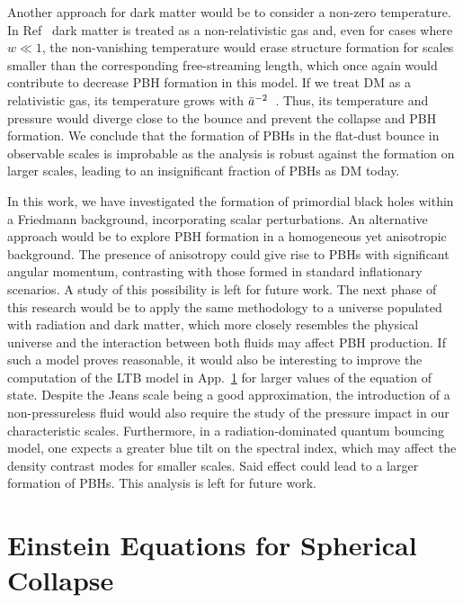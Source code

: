 \documentclass[a4paper,11pt]{article}
\begin{document}
Another approach for dark matter would be to consider a non-zero temperature. In Ref~\cite{Armendariz2014} dark matter is treated as a non-relativistic gas and, even for cases where $w\ll1$, the non-vanishing temperature would erase structure formation for scales smaller than the corresponding free-streaming length, which once again would contribute to decrease PBH formation in this model. If we treat DM as a relativistic gas, its temperature grows with $\Bar{a}^{-2}$~\cite{Mukhanov1992}. Thus, its temperature and pressure would diverge close to the bounce and prevent the collapse and PBH formation. We conclude that the formation of PBHs in the flat-dust bounce in observable scales is improbable as the analysis is robust against the formation on larger scales, leading to an insignificant fraction of PBHs as DM today.

In this work, we have investigated the formation of primordial black holes within a
Friedmann background, incorporating scalar perturbations. An alternative approach would
be to explore PBH formation in a homogeneous yet anisotropic background. The presence of
anisotropy could give rise to PBHs with significant angular momentum, contrasting with
those formed in standard inflationary scenarios. A study of this possibility is left for
future work. The next phase of this research would be to apply the same methodology to a
universe populated with radiation and dark matter, which more closely resembles the
physical universe and the interaction between both fluids may affect PBH production. If
such a model proves reasonable, it would also be interesting to improve the computation
of the LTB model in App.~\ref{appc} for larger values of the equation of state. Despite
the Jeans scale being a good approximation, the introduction of a non-pressureless fluid
would also require the study of the pressure impact in our characteristic scales.
Furthermore, in a radiation-dominated quantum bouncing model, one expects a greater blue
tilt on the spectral index, which may affect the density contrast modes for smaller
scales. Said effect could lead to a larger formation of PBHs. This analysis is left for
future work.




\appendix

\section{Einstein Equations for Spherical Collapse}
\label{appc}
\end{document}
